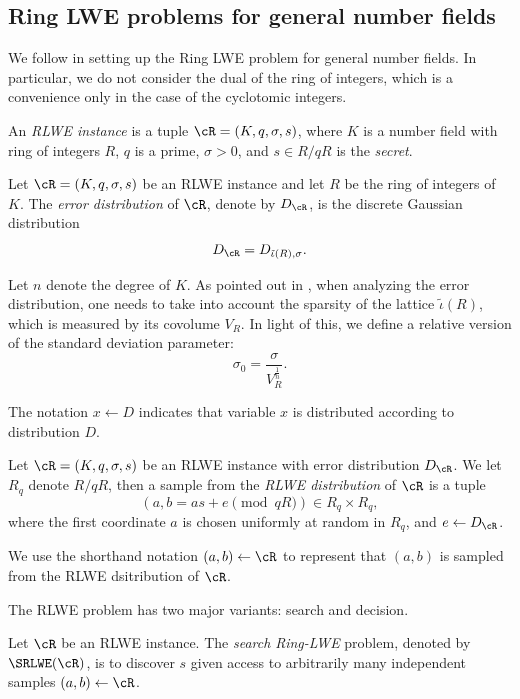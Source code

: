 \documentclass{amsart}
\begin{document}
\subsection{Ring LWE problems for general number fields}

We follow \cite{elos2015weak} in setting up the Ring LWE problem for general number fields.  In particular, we do not consider the dual of the ring of integers, which is a convenience only in the case of the cyclotomic integers.

\begin{Definition}
An {\it RLWE instance} is a tuple $\cR = (K,q,\sigma,s)$, where $K$ is a number field with ring of integers $R$, $q$ is a prime, $\sigma >0$, and $s \in R/qR$ is the {\it secret}.
\end{Definition}


\begin{Definition}
Let $\cR = (K,q,\sigma,s)$ be an RLWE instance and let $R$ be the ring of integers of $K$. The {\it error distribution} of $\cR$, denote by $D_\cR$, is the discrete Gaussian distribution
\[
D_\cR = D_{\tilde{\iota}(R),\sigma}.
\]
\end{Definition}

Let $n$ denote the degree of $K$. As pointed out in \cite{elos2015weak}, when analyzing the error distribution, one needs to take into account the sparsity of the lattice $\tilde{\iota}(R)$, which is measured by its covolume $V_R$. In light of this, we define a relative version of the standard deviation parameter: $$\sigma_0 = \frac{\sigma}{V_R^{\frac{1}{n}}}.$$

The notation $x \gets D$ indicates that variable $x$ is distributed according to distribution $D$.

\begin{Definition}
Let $\cR = (K,q,\sigma, s)$ be an RLWE instance with error distribution $D_\cR$. We let $R_q$ denote $R/qR$, then
a sample from the {\it RLWE distribution} of $\cR$ is a tuple
$$(a, b = as+e\pmod{qR}) \in R_q \times R_q, $$
where the first coordinate $a$ is chosen uniformly at random in $R_q$, and $e \gets D_\cR$.
\end{Definition}

We use the shorthand notation $(a,b) \gets \cR$ to represent that $(a,b)$ is sampled from the RLWE dsitribution of $\cR$. 

The RLWE problem has two major variants: search and decision.

\begin{Definition}
Let $\cR$ be an RLWE instance. The {\it search Ring-LWE} problem, denoted by $\SRLWE(\cR)$, is to discover $s$ given access to arbitrarily many independent samples $(a,b) \gets \cR$.
\end{Definition}
\end{document}
